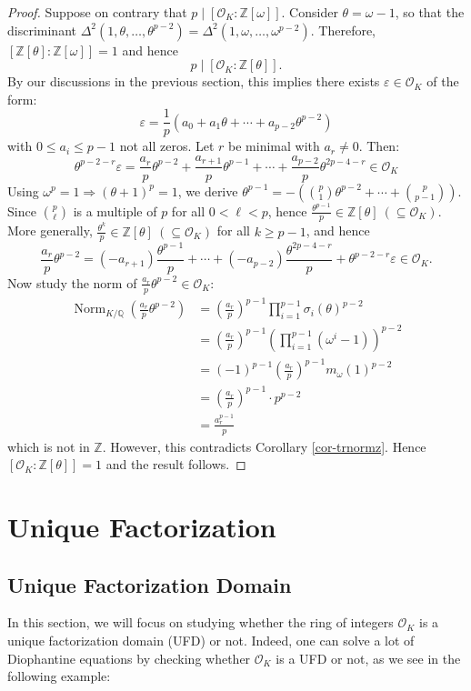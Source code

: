 \documentclass[11pt]{book}
\begin{document}
\begin{proof}
\medskip
Suppose on contrary that $p \mid [\mathcal{O}_K: \mathbb{Z}[\omega]]$. Consider $\theta = \omega - 1$, so that the discriminant $\Delta^2(1,\theta,\dots,\theta^{p-2}) = \Delta^2(1,\omega,\dots,\omega^{p-2})$. Therefore, $[\mathbb{Z}[\theta]: \mathbb{Z}[\omega]] = 1$ and hence 
$$p \mid [\mathcal{O}_K: \mathbb{Z}[\theta]].$$
By our discussions in the previous section, this implies there exists $\varepsilon \in \mathcal{O}_K$ of the form:
$$
\varepsilon = \frac{1}{p}(a_0 + a_1\theta + \cdots + a_{p-2}\theta^{p-2})
$$
with $0 \leq a_i \leq p-1$ not all zeros. Let $r$ be minimal with $a_r \neq 0$. Then:
$$
\theta^{p-2-r}\varepsilon = \frac{a_r}{p}\theta^{p-2} + \frac{a_{r+1}}{p}\theta^{p-1} + \cdots + \frac{a_{p-2}}{p}\theta^{2p-4-r} \in \mathcal{O}_K
$$
Using $\omega^p = 1 \Rightarrow (\theta+1)^p = 1$, we derive
$
\theta^{p-1} = -\left(\binom{p}{1}\theta^{p-2} + \cdots + \binom{p}{p-1}\right)
$. Since $\binom{p}{\ell}$ is a multiple of $p$ for all $0 < \ell < p$, hence $\frac{\theta^{p-1}}{p} \in \mathbb{Z}[\theta] \ (\subseteq \mathcal{O}_K)$. More generally, $\frac{\theta^k}{p} \in \mathbb{Z}[\theta]  \ (\subseteq \mathcal{O}_K)$ for all $k \geq p-1$, and hence 
$$\frac{a_r}{p}\theta^{p-2}  = (-a_{r+1})\frac{\theta^{p-1}}{p} + \cdots + (-a_{p-2})\frac{\theta^{2p-4-r}}{p}+\theta^{p-2-r}\varepsilon \in \mathcal{O}_K.
$$
Now study the norm of $\frac{a_r}{p}\theta^{p-2} \in \mathcal{O}_K$:
\begin{align*}
\operatorname{Norm}_{K/\mathbb{Q}}\left(\frac{a_r}{p}\theta^{p-2}\right) &= \left(\frac{a_r}{p}\right)^{p-1} \prod_{i=1}^{p-1} \sigma_i(\theta)^{p-2} \\
&= \left(\frac{a_r}{p}\right)^{p-1} \left(\prod_{i=1}^{p-1} (\omega^i-1)\right)^{p-2} \\
&= (-1)^{p-1}\left(\frac{a_r}{p}\right)^{p-1} m_{\omega}(1)^{p-2} \\
&= \left(\frac{a_r}{p}\right)^{p-1} \cdot p^{p-2} \\
&= \frac{a_r^{p-1}}{p}
\end{align*}
which is not in $\mathbb{Z}$. However, this contradicts Corollary \ref{cor-trnormz}. Hence $[\mathcal{O}_K : \mathbb{Z}[\theta]] = 1$ and the result follows.
\end{proof}

\chapter{Unique Factorization}
\section{Unique Factorization Domain}
In this section, we will focus on studying whether the ring of integers $\mathcal{O}_K$ is a unique factorization domain (UFD) or not. Indeed, one can solve a lot of Diophantine equations by checking whether $\mathcal{O}_K$ is a UFD or not, as we see in the following example:
\end{document}

